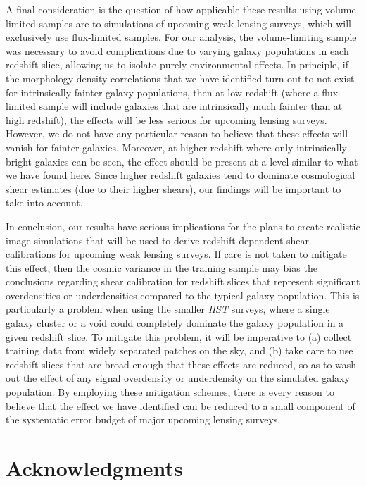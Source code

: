 \documentclass[twocolumn,useAMS,usenatbib]{mn2e}
\begin{document}
A final consideration is the question of how applicable these results
using volume-limited samples are to simulations of upcoming weak
lensing surveys, which will exclusively use flux-limited samples.  For
our analysis, the volume-limiting sample was necessary to avoid
complications due to varying galaxy populations in each redshift
slice, allowing us to isolate purely environmental effects.  In
principle, if the morphology-density correlations that we have
identified turn out to not exist for intrinsically fainter galaxy
populations, then at low redshift (where a flux limited sample will
include galaxies that are intrinsically much fainter than at high
redshift), the effects will be less serious for upcoming lensing
surveys.  However, we do not have any particular reason to believe
that these effects will vanish for fainter galaxies.  Moreover, at
higher redshift where only intrinsically bright galaxies can be seen,
the effect should be present at a level similar to what we have found
here.  Since higher redshift galaxies tend to dominate cosmological
shear estimates (due to their higher shears), our findings will be
important to take into account.

In conclusion, our results have serious implications for the plans to
create realistic image simulations that will be used to derive
redshift-dependent shear calibrations for upcoming weak lensing
surveys.  If care is not taken to mitigate this effect, then the
cosmic variance in the training sample may bias the conclusions
regarding shear calibration for redshift slices that represent
significant overdensities or underdensities compared to the typical
galaxy population.  This is particularly a problem when using the
smaller {\em HST} surveys, where a single galaxy cluster or a void
could completely dominate the galaxy population in a given redshift
slice.  To mitigate this problem, it will be imperative to (a) collect
training data from widely separated patches on the sky, and (b) take
care to use redshift slices that are broad enough that these effects
are reduced, so as to wash out the effect of any signal overdensity or
underdensity on the simulated galaxy population.  By employing these
mitigation schemes, there is every reason to believe that the effect
we have identified can be reduced to a small component of the
systematic error budget of major upcoming lensing surveys.


\section*{Acknowledgments}
\end{document}
